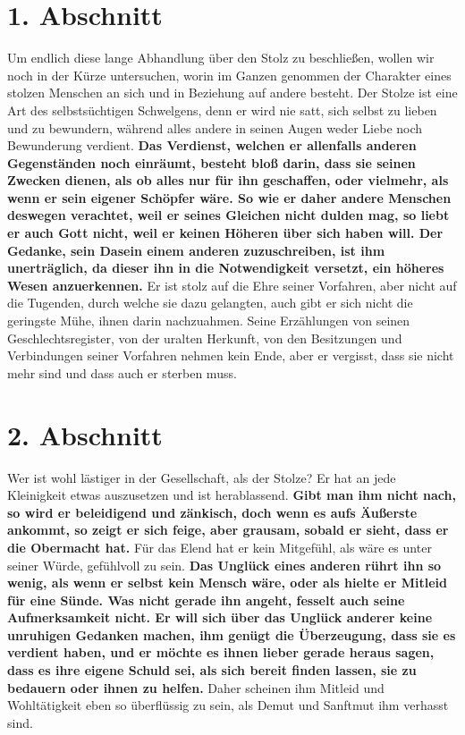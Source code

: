 \newpage

\section{1. Abschnitt} \label{kap12_ab1}

 Um endlich diese lange Abhandlung über den Stolz
zu beschließen, wollen wir noch
in der Kürze untersuchen, worin im Ganzen genommen der Charakter eines stolzen
Menschen an sich und in Beziehung auf andere besteht. Der Stolze ist eine Art
des
selbstsüchtigen Schwelgens, denn er wird nie satt, sich selbst zu lieben und zu
bewundern, während alles andere in seinen Augen weder Liebe noch Bewunderung
verdient.  \label{ref:12_01_egoisten}
\textbf{Das Verdienst, welchen er allenfalls anderen
Gegenständen noch
einräumt, besteht bloß darin, dass sie seinen Zwecken dienen, als ob alles nur
für ihn geschaffen, oder vielmehr, als wenn er sein eigener Schöpfer wäre. So
wie er daher andere Menschen deswegen verachtet, weil er seines Gleichen nicht
dulden mag, so liebt er auch Gott nicht, weil er keinen Höheren über sich haben
will. Der Gedanke, sein Dasein einem anderen zuzuschreiben, ist ihm
unerträglich,
da dieser ihn in die Notwendigkeit versetzt, ein höheres Wesen anzuerkennen.}
Er
ist stolz auf die Ehre seiner Vorfahren, aber nicht auf die Tugenden, durch
welche sie dazu gelangten, auch gibt er sich nicht die geringste Mühe, ihnen
darin nachzuahmen. Seine Erzählungen von seinen Geschlechtsregister, von der
uralten Herkunft, von den Besitzungen und Verbindungen seiner Vorfahren nehmen
kein Ende, aber er vergisst, dass sie nicht mehr sind und dass auch er sterben
muss.

\section{2. Abschnitt} \label{kap12_ab2}

Wer ist wohl lästiger in der Gesellschaft, als der Stolze?
Er hat an jede Kleinigkeit etwas auszusetzen und ist
herablassend.
\label{ref:12_02_eitle_menschen_streit}
\textbf{Gibt man ihm nicht nach,
so wird er beleidigend und zänkisch, doch wenn es aufs Äußerste ankommt, so
zeigt
er sich feige, aber grausam, sobald er sieht, dass er die
Obermacht hat.} Für das
Elend hat er kein Mitgefühl, als wäre es unter seiner
Würde, gefühlvoll zu sein. \label{ref:12_02_eitle_menschen_mitgefuehl}
\textbf{Das Unglück eines anderen rührt ihn so wenig, als wenn er selbst kein
Mensch
wäre, oder als hielte er Mitleid für eine Sünde. Was nicht gerade
ihn angeht,
fesselt auch seine Aufmerksamkeit nicht. Er will sich über das Unglück anderer
keine unruhigen Gedanken machen, ihm genügt die Überzeugung, dass sie es
verdient haben, und er möchte es ihnen lieber gerade heraus sagen, dass es ihre
eigene Schuld sei, als sich bereit finden lassen, sie zu bedauern
oder ihnen zu
helfen.} Daher scheinen ihm Mitleid und Wohltätigkeit eben so
überflüssig zu
sein, als Demut und Sanftmut ihm verhasst sind.

